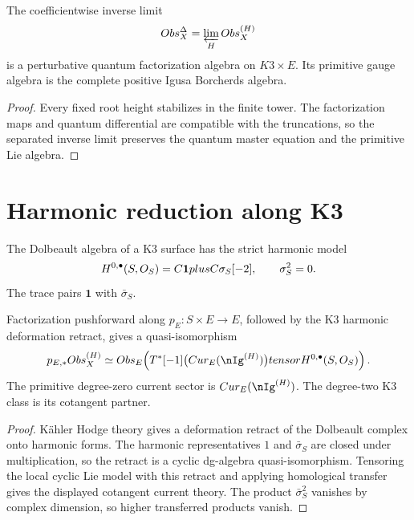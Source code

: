 \begin{corollary}
The coefficientwise inverse limit
\[
 Obs_X^{\Delta}=\varprojlim_HObs_X^{(H)}
\]
is a perturbative quantum factorization algebra on $K3\times E$.  Its primitive gauge algebra is the complete positive Igusa Borcherds algebra.
\end{corollary}
\begin{proof}
Every fixed root height stabilizes in the finite tower.  The factorization maps and quantum differential are compatible with the truncations, so the separated inverse limit preserves the quantum master equation and the primitive Lie algebra.
\end{proof}

\chapter{Harmonic reduction along K3}
The Dolbeault algebra of a K3 surface has the strict harmonic model
\[
 H^{0,\bullet}(S,O_S)
 =C\mathbf1plusC\sigma_S[-2],
 \qquad
 \sigma_S^2=0.
\]
The trace pairs $\mathbf1$ with $\bar\sigma_S$.

\begin{theorem}
Factorization pushforward along $p_E:S\times E\to E$, followed by the K3 harmonic deformation retract, gives a quasi-isomorphism
\[
 p_{E,*}\Obs_X^{(H)}
 \simeq
 \Obs_E\!\left(
 T^*[-1]\bigl(\Cur_E(\nIg^{(H)})\bigr)
 \tensor H^{0,\bullet}(S,\Ocal_S)
 \right).
\]
The primitive degree-zero current sector is $\Cur_E(\nIg^{(H)})$.  The degree-two K3 class is its cotangent partner.
\end{theorem}
\begin{proof}
Kähler Hodge theory gives a deformation retract of the Dolbeault complex onto harmonic forms.  The harmonic representatives $1$ and $\bar\sigma_S$ are closed under multiplication, so the retract is a cyclic dg-algebra quasi-isomorphism.  Tensoring the local cyclic Lie model with this retract and applying homological transfer gives the displayed cotangent current theory.  The product $\bar\sigma_S^2$ vanishes by complex dimension, so higher transferred products vanish.
\end{proof}

